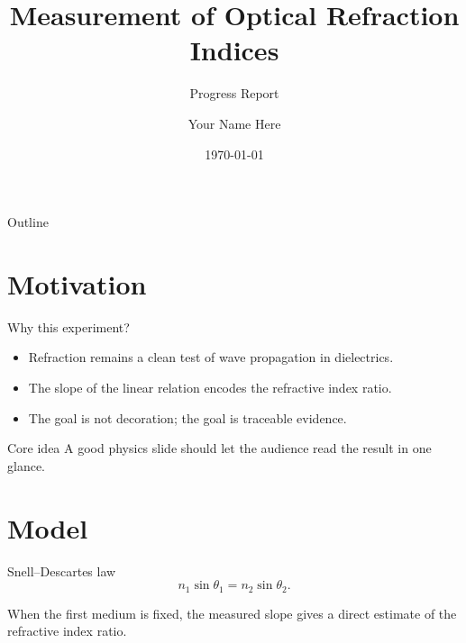 \documentclass[aspectratio=169,sans]{beamer}
\title[Optics Report]{Measurement of Optical Refraction Indices}
\subtitle{Progress Report}
\author[Your Name]{Your Name Here}
\institute[Physics Department]{Department of Physics \and University of Example}
\date{\today}
\begin{document}
\begin{frame}[plain]
  \titlepage
\end{frame}

\begin{frame}{Outline}
  \tableofcontents[hideallsubsections]
\end{frame}

\section{Motivation}
\begin{frame}{Why this experiment?}
  \begin{itemize}
    \item Refraction remains a clean test of wave propagation in dielectrics.
    \item The slope of the linear relation encodes the refractive index ratio.
    \item The goal is not decoration; the goal is traceable evidence.
  \end{itemize}

  \begin{block}{Core idea}
    A good physics slide should let the audience read the result in one glance.
  \end{block}
\end{frame}

\section{Model}
\begin{frame}{Snell--Descartes law}
  \begin{equation*}
    n_1\sin\theta_1 = n_2\sin\theta_2.
  \end{equation*}

  \vspace{0.2cm}
  When the first medium is fixed, the measured slope gives a direct estimate of the refractive index ratio.
\end{frame}
\end{document}
